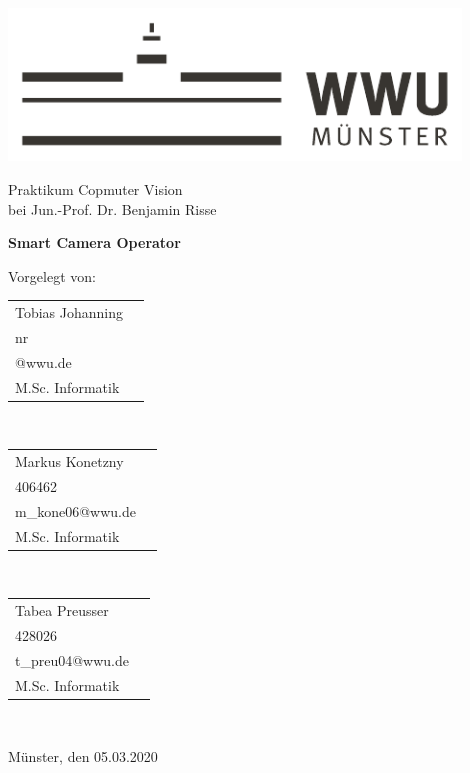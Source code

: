 
\begin{centering}
\vspace{4cm}
\includegraphics[width=12cm]{./img/wwu-logo-neu.pdf}

\vspace{2cm} 

{\large
	Praktikum Copmuter Vision\\[0.5cm]
	bei Jun.-Prof. Dr. Benjamin Risse\\[1cm]
}

{\LARGE
	\textbf{Smart Camera Operator}\\[2cm]
}


{\large
	Vorgelegt von:\\[0.5cm]
}



\begin{minipage}{\textwidth}
\begin{minipage}[c]{0.3\textwidth}
\centering
 \begin{tabular}{ll}
 		Tobias Johanning \\
    	{nr} \\
    	{@wwu.de} \\
    	 M.Sc. Informatik\\
    \end{tabular}\\
\end{minipage}\hfill
\begin{minipage}[c]{0.3\textwidth}
\centering
   \begin{tabular}{ll}
 		Markus Konetzny \\
    	{406462} \\
    	{m_kone06@wwu.de} \\
    	M.Sc. Informatik\\
    \end{tabular}\\
\end{minipage}\hfill
\begin{minipage}[c]{0.3\textwidth}
\centering
   \begin{tabular}{ll}
 		Tabea Preusser \\
    	{428026} \\
    	{t_preu04@wwu.de} \\
    	M.Sc. Informatik\\
    \end{tabular}\\
\end{minipage}\hfill
\end{minipage}

\vspace{2 cm}
{\large
	Münster, den 05.03.2020\\[1cm]
}
\end{centering}

\vfill


 

